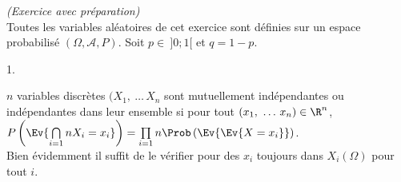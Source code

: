 \documentclass[11pt]{article}%
\begin{document}
 \begin{exercice}{\it (Exercice avec préparation)}~\\
 Toutes les variables aléatoires de cet exercice sont définies sur
 un espace probabilisé $(\Omega, \mathcal{A}, P)$. Soit $p \in \ ]0
 ; 1[$ et $q = 1-p$.
 \begin{noliste}{1.}
 \setlength{\itemsep}{4mm}
 \item $n$ variables discrètes $(X_{1},\ \dots\, X_{n}$ sont
mutuellement indépendantes ou indépendantes dans leur ensemble si pour
tout $(x_{1},\ \dots\, x_{n}) \in \R^{n}$, $P \left(\Ev{
\bigcap\limits_{i = 1}{n} X_{i} = x_{i}}\right) = \prod\limits_{i =
1}{n} \Prob\left(\Ev{\Ev{ X = x_{i}}}\right)$. \\
 Bien évidemment il suffit de le vérifier pour des $x_{i}$ toujours
dans $X_{i} (\Omega)$ pour tout $i$. \\


\end{noliste}
\end{exercice}
\end{document}
